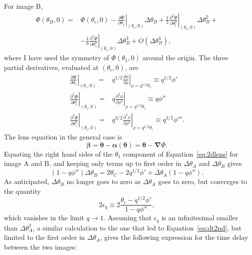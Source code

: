 \documentclass[usenatbib]{mnras}
\def\Eref#1{Equation~\ref{#1}\xspace}
\begin{document}
For image B,
\begin{align}
\Phi(\theta_B, 0) = &\Phi(\theta_c, 0) - \left.\frac{\partial\Phi}{\partial\theta_1}\right\rvert_{(\theta_c,0)}\Delta\theta_B + \frac12\left.\frac{\partial^2\Phi}{\partial\theta_1^2}\right\rvert_{(\theta_c,0)}\Delta\theta_B^2 + \nonumber \\
& - \frac16\left.\frac{\partial^3\Phi}{\partial\theta_1^3}\right\rvert_{(\theta_c,0)}\Delta\theta_B^3 + O(\Delta\theta_B^4),
\end{align}
where I have used the symmetry of $\Phi(\theta_1,0)$ around the origin.
The three partial derivatives, evaluated at $(\theta_c,0)$, are
\begin{align}
\left.\frac{\partial\Phi}{\partial\theta_1}\right\rvert_{(\theta_c,0)} = & q^{1/2}\left.\frac{\partial\phi}{\partial\rho}\right\rvert_{\rho=q^{1/2}\theta_c} \equiv q^{1/2}\phi' \nonumber \\
\left.\frac{\partial^2\Phi}{\partial\theta_1^2}\right\rvert_{(\theta_c,0)} = & q\left.\frac{\partial^2\phi}{\partial\rho^2}\right\rvert_{\rho=q^{1/2}\theta_c} \equiv q\phi'' \\
\left.\frac{\partial^3\Phi}{\partial\theta_1^3}\right\rvert_{(\theta_c,0)} = & q^{3/2}\left.\frac{\partial^3\phi}{\partial\rho^3}\right\rvert_{\rho=q^{1/2}\theta_c} \equiv q^{3/2}\phi''' \nonumber .
\end{align}
The lens equation in the general case is
\begin{equation}\label{eq:2dlens}
\boldsymbol\beta = \boldsymbol\theta - \boldsymbol\alpha(\boldsymbol\theta) = \boldsymbol\theta - \boldsymbol\nabla\Phi.
\end{equation}
Equating the right hand sides of the $\theta_1$ component of \Eref{eq:2dlens} for image A and B, and keeping only terms up to first order in $\Delta\theta_A$ and $\Delta\theta_B$ gives
\begin{equation}
(1-q\phi'')\Delta\theta_B = 2\theta_C - 2q^{1/2}\phi' + \Delta\theta_A(1 - q\phi'').
\end{equation}
As anticipated, $\Delta\theta_B$ no longer goes to zero as $\Delta\theta_A$ goes to zero, but converges to the quantity 
\begin{equation}\label{eq:epsilonq}
2\epsilon_q \equiv 2\frac{\theta_c - q^{1/2}\phi'}{1-q\phi''},
\end{equation}
which vanishes in the limit $q\rightarrow 1$.
Assuming that $\epsilon_q$ is an infinitesimal smaller than $\Delta\theta_A^2$, a similar calculation to the one that led to \Eref{eq:dt2nd}, but limited to the first order in $\Delta\theta_A$, gives the following expression for the time delay between the two images:
\end{document}
